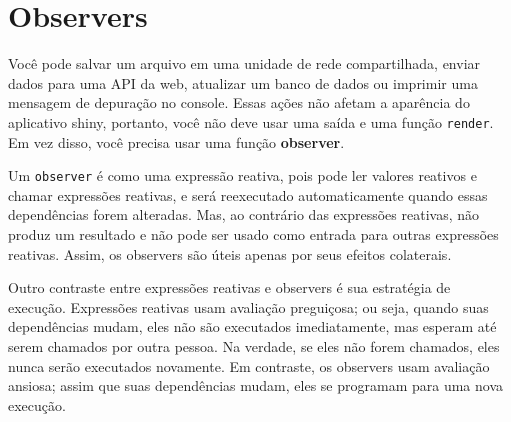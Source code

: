 \documentclass[
]{book}
\newenvironment{Shaded}{\begin{snugshade}}{\end{snugshade}}
\newcommand{\CommentTok}[1]{\textcolor[rgb]{0.56,0.35,0.01}{\textit{#1}}}
\newcommand{\ControlFlowTok}[1]{\textcolor[rgb]{0.13,0.29,0.53}{\textbf{#1}}}
\newcommand{\FunctionTok}[1]{\textcolor[rgb]{0.00,0.00,0.00}{#1}}
\newcommand{\NormalTok}[1]{#1}
\newcommand{\OtherTok}[1]{\textcolor[rgb]{0.56,0.35,0.01}{#1}}
\newcommand{\SpecialCharTok}[1]{\textcolor[rgb]{0.00,0.00,0.00}{#1}}
\newcommand{\StringTok}[1]{\textcolor[rgb]{0.31,0.60,0.02}{#1}}
\begin{document}
\begin{Shaded}
\end{Shaded}

\hypertarget{observers}{%
\section{\texorpdfstring{\textbf{Observers}}{Observers}}\label{observers}}

Você pode salvar um arquivo em uma unidade de rede compartilhada, enviar dados para uma API da web, atualizar um banco de dados ou imprimir uma mensagem de depuração no console. Essas ações não afetam a aparência do aplicativo shiny, portanto, você não deve usar uma saída e uma função \texttt{render}. Em vez disso, você precisa usar uma função \textbf{observer}.

Um \texttt{observer} é como uma expressão reativa, pois pode ler valores reativos e chamar expressões reativas, e será reexecutado automaticamente quando essas dependências forem alteradas. Mas, ao contrário das expressões reativas, não produz um resultado e não pode ser usado como entrada para outras expressões reativas. Assim, os observers são úteis apenas por seus efeitos colaterais.

Outro contraste entre expressões reativas e observers é sua estratégia de execução. Expressões reativas usam avaliação preguiçosa; ou seja, quando suas dependências mudam, eles não são executados imediatamente, mas esperam até serem chamados por outra pessoa. Na verdade, se eles não forem chamados, eles nunca serão executados novamente. Em contraste, os observers usam avaliação ansiosa; assim que suas dependências mudam, eles se programam para uma nova execução.
\end{document}
